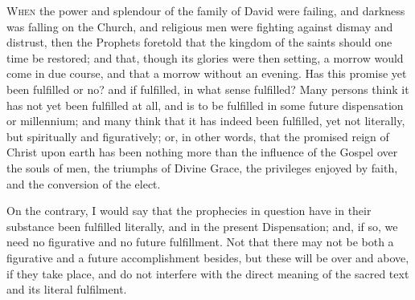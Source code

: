 W\textsc{hen} the power and splendour of the family of David were failing,
and darkness was falling on the Church, and religious men were
fighting against dismay and distrust, then the Prophets foretold that
the kingdom of the saints should one time be restored; and that,
though its glories were then setting, a morrow would come in due
course, and that a morrow without an evening. Has this promise yet
been fulfilled or no? and if fulfilled, in what sense fulfilled? Many
persons think it has not yet been fulfilled at all, and is to be
fulfilled in some future dispensation or millennium; and many think
that it has indeed been fulfilled, yet not literally, but spiritually
and figuratively; or, in other words, that the promised reign of
Christ upon earth has been nothing more than the influence of the
Gospel over the souls of men, the triumphs of Divine Grace, the
privileges enjoyed by faith, and the conversion of the elect.

On the contrary, I would say that the prophecies in question have
in their substance been fulfilled literally, and in the present
Dispensation; and, if so, we need no figurative and no future
fulfillment. Not that there may not be both a figurative and a future
accomplishment besides, but these will be over and above, if they take
place, and do not interfere with the direct meaning of the sacred text
and its literal fulfilment.


